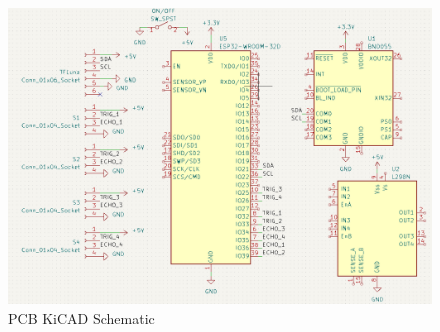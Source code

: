 \begin{figure}[H]
	\centering
	\includegraphics[width=\textwidth]{./Images/PCB-sch.png}
	\caption{\label{fig:pcb-sch}PCB KiCAD Schematic}
\end{figure}
